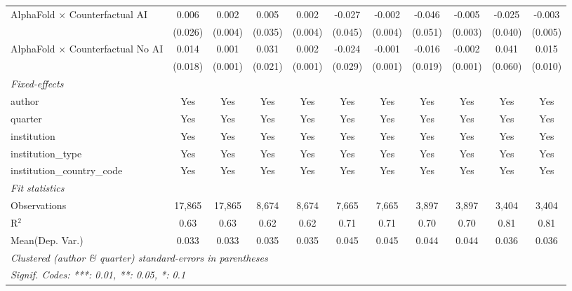 \begin{tabular}{lcccccccccc}
   AlphaFold $\times$ Counterfactual AI     & 0.006   & 0.002        & 0.005   & 0.002   & -0.027      & -0.002       & -0.046  & -0.005  & -0.025  & -0.003\\   
                                            & (0.026) & (0.004)      & (0.035) & (0.004) & (0.045)     & (0.004)      & (0.051) & (0.003) & (0.040) & (0.005)\\   
   AlphaFold $\times$ Counterfactual No AI  & 0.014   & 0.001        & 0.031   & 0.002   & -0.024      & -0.001       & -0.016  & -0.002  & 0.041   & 0.015\\   
                                            & (0.018) & (0.001)      & (0.021) & (0.001) & (0.029)     & (0.001)      & (0.019) & (0.001) & (0.060) & (0.010)\\   
   \midrule
   \emph{Fixed-effects}\\
   author                                   & Yes     & Yes          & Yes     & Yes     & Yes         & Yes          & Yes     & Yes     & Yes     & Yes\\  
   quarter                                  & Yes     & Yes          & Yes     & Yes     & Yes         & Yes          & Yes     & Yes     & Yes     & Yes\\  
   institution                              & Yes     & Yes          & Yes     & Yes     & Yes         & Yes          & Yes     & Yes     & Yes     & Yes\\  
   institution\_type                        & Yes     & Yes          & Yes     & Yes     & Yes         & Yes          & Yes     & Yes     & Yes     & Yes\\  
   institution\_country\_code               & Yes     & Yes          & Yes     & Yes     & Yes         & Yes          & Yes     & Yes     & Yes     & Yes\\  
   \midrule
   \emph{Fit statistics}\\
   Observations                             & 17,865  & 17,865       & 8,674   & 8,674   & 7,665       & 7,665        & 3,897   & 3,897   & 3,404   & 3,404\\  
   R$^2$                                    & 0.63    & 0.63         & 0.62    & 0.62    & 0.71        & 0.71         & 0.70    & 0.70    & 0.81    & 0.81\\  
Mean(Dep. Var.) & 0.033 & 0.033 & 0.035 & 0.035 & 0.045 & 0.045 & 0.044 & 0.044 & 0.036 & 0.036 \\
   \midrule \midrule
   \multicolumn{11}{l}{\emph{Clustered (author \& quarter) standard-errors in parentheses}}\\
   \multicolumn{11}{l}{\emph{Signif. Codes: ***: 0.01, **: 0.05, *: 0.1}}\\
\end{tabular}
\par\endgroup
